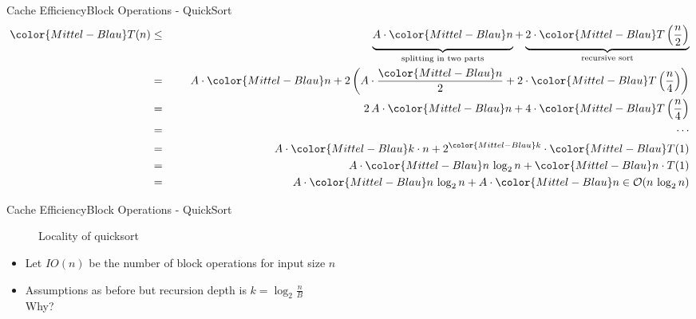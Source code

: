 \begin{frame}{Cache Efficiency}{Block Operations - QuickSort}
  \begin{eqnarray*}
    {\color{Mittel-Blau}T(n)} &\leq\hspace{1.5em}&
      \underbrace{
        A \cdot {\color{Mittel-Blau}n}
        \vphantom{\frac{n}{2}}
      }_{\text{splitting in two parts}}
      +
      \underbrace{
        2 \cdot {\color{Mittel-Blau}T\left(\frac{n}{2}\right)}
      }_{\text{recursive sort}}\\
    {} &=&
      A \cdot {\color{Mittel-Blau}n} + 2 \left(
        A \cdot \frac{\color{Mittel-Blau}n}{2}
        + 2 \cdot {\color{Mittel-Blau}T\left(\frac{n}{4}\right)}
      \right)\\
    {} &=&
      2\,A \cdot {\color{Mittel-Blau}n}
      + 4 \cdot {\color{Mittel-Blau}T\left(\frac{n}{4}\right)}\\
    {} &=&\hspace{1.5em}\cdots\\
    {} &=&
      A \cdot {\color{Mittel-Blau}k \cdot n}
      + 2^{\color{Mittel-Blau}k}
      \cdot {\color{Mittel-Blau}T(1)}\\
    {} &=&
      A \cdot {\color{Mittel-Blau}n \, \log_2 n}
      + {\color{Mittel-Blau}n \cdot T(1)}\\
    {} &=&
      A \cdot {\color{Mittel-Blau}n \, \log_2 n}
      + A \cdot {\color{Mittel-Blau}n}
      \in \mathcal{O}(n \, \log_2 n)
  \end{eqnarray*}
\end{frame}


\begin{frame}{Cache Efficiency}{Block Operations - QuickSort}
  \begin{figure}%
    \begin{adjustbox}{width=\linewidth}%
    \end{adjustbox}%
    \caption{Locality of quicksort}
    \label{fig:caching:memory_locality_quicksort}
  \end{figure}%
  \begin{itemize}
    \item
      Let {\color{Mittel-Blau}$IO(n)$} be the number of
      {\color{Mittel-Blau}block operations} for input size $n$
    \item
      Assumptions as before but
      {\color{Mittel-Blau}recursion depth is $k = \log_2 \frac{n}{B}$}\\
      {\color{gray}Why?}
  \end{itemize}
\end{frame}

